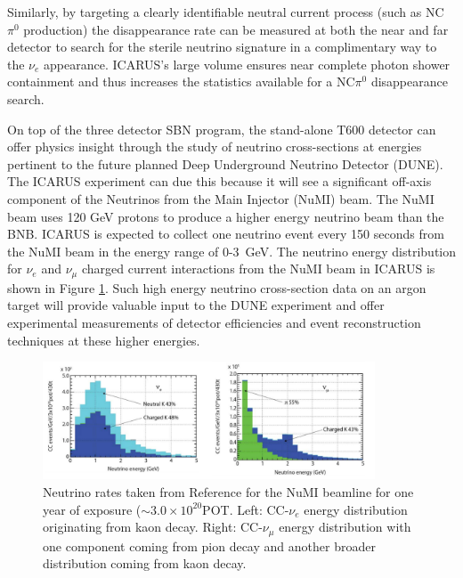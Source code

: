Similarly, by targeting a clearly identifiable neutral current process (such as NC$\pi^{0}$ production) the disappearance rate can be measured at both the near and far detector to search for the sterile neutrino signature in a complimentary way to the $\nu_{e}$ appearance. ICARUS's large volume ensures near complete photon shower containment and thus increases the statistics available for a NC$\pi^{0}$ disappearance search.

On top of the three detector SBN program, the stand-alone T600 detector can offer physics insight through the study of neutrino cross-sections at energies pertinent to the future planned Deep Underground Neutrino Detector (DUNE). The ICARUS experiment can due this because it will see a significant off-axis component of the Neutrinos from the Main Injector (NuMI) beam. The NuMI beam uses 120 GeV protons to produce a higher energy neutrino beam than the BNB. ICARUS is expected to collect one neutrino event every 150 seconds from the NuMI beam in the energy range of 0-3~GeV. The neutrino energy distribution for $\nu_{e}$ and $\nu_{\mu}$ charged current interactions from the NuMI beam in ICARUS is shown in Figure \ref{fig:NuMIICARUS}. Such high energy neutrino cross-section data on an argon target will provide valuable input to the DUNE experiment and offer experimental measurements of detector efficiencies and event reconstruction techniques at these higher energies.

\begin{figure}[htb]
\centering
\includegraphics[width=0.88\textwidth]{images/ICARUS_NUMI.png}
\caption[]{Neutrino rates taken from Reference \cite{} for the NuMI beamline for one year of exposure ($\sim 3.0 \times 10^{20}$POT. Left: CC-$\nu_{e}$ energy distribution originating from kaon decay. Right: CC-$\nu_{\mu}$ energy distribution with one component coming from pion decay and another broader distribution coming from kaon decay.}
\label{fig:NuMIICARUS}
\end{figure}

